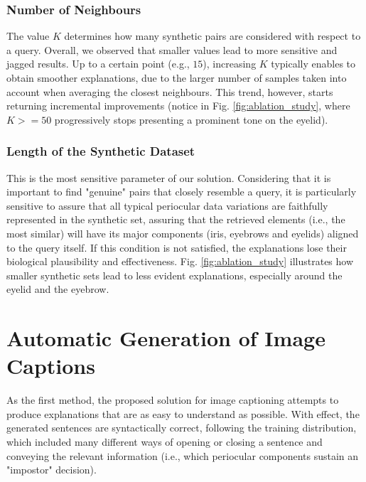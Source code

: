 \subsubsection{Number of Neighbours}
\label{subsubsec:chap4_number_of_closest_neighbours}
The value $K$ determines how many synthetic pairs are considered with respect to a query. Overall, we observed that smaller values lead to more sensitive and jagged results. Up to a certain point (e.g., $15$), increasing $K$ typically enables to obtain smoother explanations, due to the larger number of samples taken into account when averaging the closest neighbours. This trend, however, starts returning incremental improvements (notice in Fig. \ref{fig:ablation_study}, where $K>=50$  progressively stops presenting a prominent tone on the eyelid).

\subsubsection{Length of the Synthetic Dataset}
\label{subsubsec:chap4_synthetic_dataset_length}

This is the most sensitive parameter of our solution. Considering that it is important to find "genuine" pairs that closely resemble a query, it is particularly sensitive to assure that all typical periocular data variations are faithfully represented in the synthetic set, assuring that the retrieved elements (i.e., the most similar) will have its major components (iris, eyebrows and eyelids) aligned to the query itself. If this condition is not satisfied, the explanations lose their biological plausibility and effectiveness.
Fig. \ref{fig:ablation_study} illustrates how smaller synthetic sets lead to less evident explanations, especially around the eyelid and the eyebrow. 

\section{Automatic Generation of Image Captions}
\label{sec:chap4_method_b_results}

As the first method, the proposed solution for image captioning attempts to produce explanations that are as easy to understand as possible. With effect, the generated sentences are syntactically correct, following the training distribution, which included many different ways of opening or closing a sentence and conveying the relevant information (i.e., which periocular components sustain an "impostor" decision).

